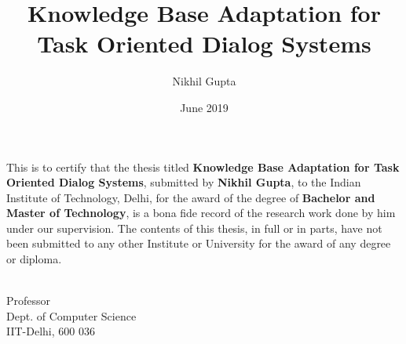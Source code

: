 \documentclass[Dual]{iitddiss}
\begin{document}


\title{Knowledge Base Adaptation for \\ Task Oriented Dialog Systems}

\author{Nikhil Gupta}
\date{June 2019}

\maketitle

\certificate

\vspace*{0.5in}

\noindent This is to certify that the thesis titled {\bf Knowledge Base Adaptation for Task Oriented Dialog Systems}, submitted by {\bf Nikhil Gupta},
  to the Indian Institute of Technology, Delhi, for
the award of the degree of {\bf Bachelor and Master of Technology}, is a bona fide
record of the research work done by him under our supervision.  The
contents of this thesis, in full or in parts, have not been submitted
to any other Institute or University for the award of any degree or
diploma.

\vspace*{1.5in}

\begin{singlespacing}
\hspace*{-0.25in}
\parbox{2.5in}{
 \\
\noindent Professor \\
\noindent Dept. of Computer Science\\
\noindent IIT-Delhi, 600 036 \\
}
\hspace*{1.0in}
\end{singlespacing}
\vspace*{0.25in}


\acknowledgements

\pagebreak

\end{document}
